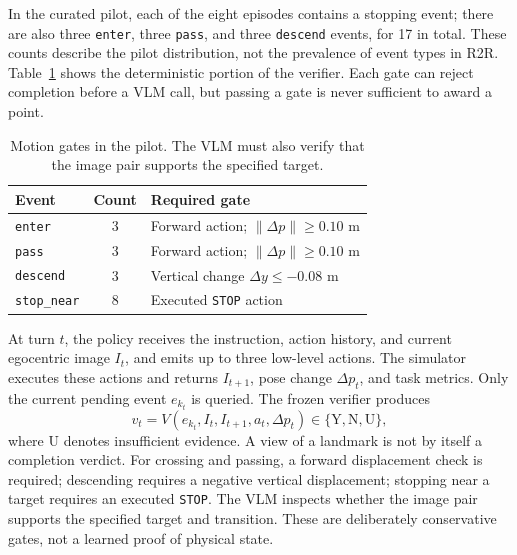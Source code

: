 \documentclass[10pt,twocolumn,letterpaper]{article}
\begin{document}
In the curated pilot, each of the eight episodes contains a stopping event; there are also three \texttt{enter}, three \texttt{pass}, and three \texttt{descend} events, for 17 in total. These counts describe the pilot distribution, not the prevalence of event types in R2R. Table~\ref{tab:gates} shows the deterministic portion of the verifier. Each gate can reject completion before a VLM call, but passing a gate is never sufficient to award a point.

\begin{table}[t]
\centering
\caption{Motion gates in the pilot. The VLM must also verify that the image pair supports the specified target.}
\label{tab:gates}
\footnotesize
\begin{tabular}{lcl}
\toprule
Event & Count & Required gate \\
\midrule
\texttt{enter} & 3 & Forward action; $\|\Delta p\|\geq0.10$ m \\
\texttt{pass} & 3 & Forward action; $\|\Delta p\|\geq0.10$ m \\
\texttt{descend} & 3 & Vertical change $\Delta y\leq-0.08$ m \\
\texttt{stop\_near} & 8 & Executed \texttt{STOP} action \\
\bottomrule
\end{tabular}
\end{table}

At turn $t$, the policy receives the instruction, action history, and current egocentric image $I_t$, and emits up to three low-level actions. The simulator executes these actions and returns $I_{t+1}$, pose change $\Delta p_t$, and task metrics. Only the current pending event $e_{k_t}$ is queried. The frozen verifier produces
\begin{equation}
v_t=V(e_{k_t}, I_t,I_{t+1},a_t,\Delta p_t)
\in\{\mathrm{Y},\mathrm{N},\mathrm{U}\},
\label{eq:verifier}
\end{equation}
where $\mathrm{U}$ denotes insufficient evidence. A view of a landmark is not by itself a completion verdict. For crossing and passing, a forward displacement check is required; descending requires a negative vertical displacement; stopping near a target requires an executed \texttt{STOP}. The VLM inspects whether the image pair supports the specified target and transition. These are deliberately conservative gates, not a learned proof of physical state.
\end{document}
